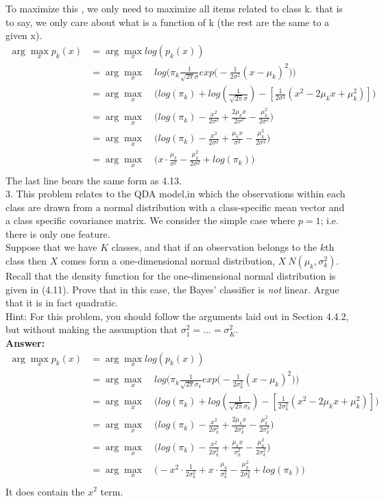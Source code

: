 \documentclass[12pt]{article}
\begin{document}
To maximize this , we only need to maximize all items related to class k. that is to say, we only care about what is a function of k (the rest are the same to a given x).
\begin{align*}
\arg\max_x{p_k(x)}&=\arg\max_x{log(p_k(x))}\\
&=\arg\max_x \quad log\Big(\pi_k\frac{1}{\sqrt{2\pi}\sigma}exp\big(-\frac{1}{2\sigma^2}(x-\mu_k)^2\big)\Big)\\
&=\arg\max_x \quad \Big(log(\pi_k)+log(\frac{1}{\sqrt{2\pi}\sigma})-[\frac{1}{2\sigma^2}(x^2-2\mu_kx+\mu_k^2)]\Big)\\
&=\arg\max_x \quad \Big(log(\pi_k)-\frac{x^2}{2\sigma^2}+\frac{2\mu_kx}{2\sigma^2}-\frac{\mu_k^2}{2\sigma^2}\Big)\\
&=\arg\max_x \quad \Big(log(\pi_k)-\frac{x^2}{2\sigma^2}+\frac{\mu_kx}{\sigma^2}-\frac{\mu_k^2}{2\sigma^2}\Big)\\
&=\arg\max_x\quad\Big(x\cdot\frac{\mu_k}{\sigma^2}-\frac{\mu_k^2}{2\sigma^2}+log(\pi_k)\Big)\\
\end{align*}
The last line bears the same form as 4.13.\\

3. This problem relates to the QDA model,in which the observations within each class are drawn from a normal distribution with a class-specific mean vector and a class specific covariance matrix. We consider the simple case where $p=1$; i.e. there is only one feature.\\

Suppose that we have $K$ classes, and that if an observation belongs to the $k$th class then $X$ comes form a one-dimensional normal distribution, $X~N(\mu_k,\sigma_k^2)$. Recall that the density function for the one-dimensional normal distribution is given in (4.11). Prove that in this case, the Bayes' classifier is \textit{not} linear. Argue that it is in fact quadratic. \\

Hint: For this problem, you should follow the arguments laid out in Section 4.4.2, but without making the assumption that $\sigma_1^2=...=\sigma_K^2.$ \\

\textbf{Answer:}\\
\begin{align*}
\arg\max_x{p_k(x)}&=\arg\max_x{log(p_k(x))}\\
&=\arg\max_x \quad log\Big(\pi_k\frac{1}{\sqrt{2\pi}\sigma_k}exp\big(-\frac{1}{2\sigma_k^2}(x-\mu_k)^2\big)\Big)\\
&=\arg\max_x \quad \Big(log(\pi_k)+log(\frac{1}{\sqrt{2\pi}\sigma_k})-[\frac{1}{2\sigma_k^2}(x^2-2\mu_kx+\mu_k^2)]\Big)\\
&=\arg\max_x \quad \Big(log(\pi_k)-\frac{x^2}{2\sigma_k^2}+\frac{2\mu_kx}{2\sigma_k^2}-\frac{\mu_k^2}{2\sigma_k^2}\Big)\\
&=\arg\max_x \quad \Big(log(\pi_k)-\frac{x^2}{2\sigma_k^2}+\frac{\mu_kx}{\sigma_k^2}-\frac{\mu_k^2}{2\sigma_k^2}\Big)\\
&=\arg\max_x \quad \Big(-x^2\cdot \frac{1}{2\sigma_k^2}+x\cdot \frac{\mu_k}{\sigma_k^2}-\frac{\mu_k^2}{2\sigma_k^2}+log(\pi_k)\Big)\\
\end{align*}
It does contain the $x^2$ term. 
\end{document}
